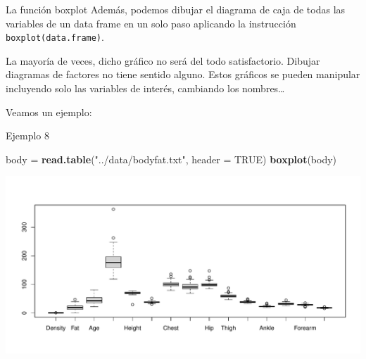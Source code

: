 \documentclass[
  ignorenonframetext,
]{beamer}
\newenvironment{Shaded}{\begin{snugshade}}{\end{snugshade}}
\newcommand{\AttributeTok}[1]{\textcolor[rgb]{0.13,0.29,0.53}{#1}}
\newcommand{\ConstantTok}[1]{\textcolor[rgb]{0.56,0.35,0.01}{#1}}
\newcommand{\FunctionTok}[1]{\textcolor[rgb]{0.13,0.29,0.53}{\textbf{#1}}}
\newcommand{\NormalTok}[1]{#1}
\newcommand{\OtherTok}[1]{\textcolor[rgb]{0.56,0.35,0.01}{#1}}
\newcommand{\StringTok}[1]{\textcolor[rgb]{0.31,0.60,0.02}{#1}}
\begin{document}
\begin{frame}[fragile]{La función boxplot}
\label{la-funciuxf3n-boxplot-2}
Además, podemos dibujar el diagrama de caja de todas las variables de un
data frame en un solo paso aplicando la instrucción
\texttt{boxplot(data.frame)}.

La mayoría de veces, dicho gráfico no será del todo satisfactorio.
Dibujar diagramas de factores no tiene sentido alguno. Estos gráficos se
pueden manipular incluyendo solo las variables de interés, cambiando los
nombres\ldots{}

Veamos un ejemplo:
\end{frame}

\begin{frame}[fragile]{Ejemplo 8}
\label{ejemplo-8}
\begin{Shaded}
\begin{Highlighting}[]
\NormalTok{body }\OtherTok{=} \FunctionTok{read.table}\NormalTok{(}\StringTok{"../data/bodyfat.txt"}\NormalTok{, }\AttributeTok{header =} \ConstantTok{TRUE}\NormalTok{)}
\FunctionTok{boxplot}\NormalTok{(body)}
\end{Highlighting}
\end{Shaded}

\includegraphics[width=0.8\linewidth]{R_base_files/figure-beamer/unnamed-chunk-188-1}
\end{frame}
\end{document}
